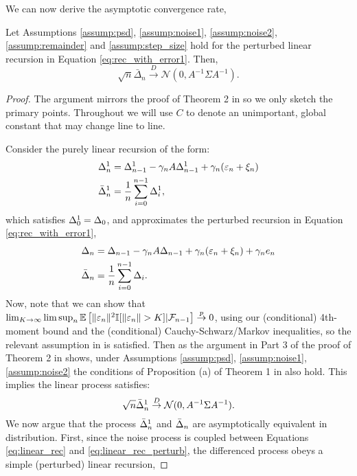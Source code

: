 We can now derive the asymptotic convergence rate,
\begin{theorem} \label{thm:asymp_ave}
  Let Assumptions \ref{assump:psd}, \ref{assump:noise1}, \ref{assump:noise2}, \ref{assump:remainder} and \ref{assump:step_size}
  hold for the perturbed linear recursion in Equation \eqref{eq:rec_with_error1}.
  Then,
\[
\sqrt n \bar{\Delta}_n  \overset{D}{\to} \mathcal N (0,  A^{-1}\Sigma A^{-1}).
\]
\end{theorem}
\begin{proof}
The argument mirrors the proof of Theorem 2 in \citet{polyak1992acceleration} so we only
sketch the primary points. Throughout we will use $C$ to denote an unimportant, global constant that may change line to line.

Consider the purely linear recursion of the form:
\begin{align}
  & \Delta^1_{n}=\Delta^1_{n-1} -\gamma_n A \Delta^1_{n-1}+ \gamma_n (\varepsilon_n+\xi_{n}) \label{eq:linear_rec} \\
  & \bar{\Delta}^1_{n} = \frac{1}{n} \sum_{i=0}^{n-1} \Delta^1_{i}, \nonumber
\end{align}
which satisfies $\Delta^1_{0} = \Delta_{0}$, and approximates the perturbed recursion in Equation \eqref{eq:rec_with_error1},
\begin{align}
  & \Delta_{n}=\Delta_{n-1} -\gamma_n A \Delta_{n-1}+ \gamma_n (\varepsilon_n+\xi_{n}) + \gamma_n e_{n} \label{eq:linear_rec_perturb} \\
  & \bar{\Delta}_{n} = \frac{1}{n} \sum_{i=0}^{n-1} \Delta_{i}. \nonumber
\end{align}
Now, note that we can show that
$\lim_{K \to \infty} \lim \sup_{n} \mathbb{E} \left[\Vert \varepsilon_n \Vert^2 \mathbb{I}[\Vert \varepsilon_n \Vert > K]|\mathcal{F}_{n-1} \right] \overset{p}{\to} 0$, using our (conditional) 4th-moment bound and the (conditional) Cauchy-Schwarz/Markov inequalities, so the relevant assumption in \citet{polyak1992acceleration} is satisfied. Then as the argument in Part 3 of the proof of Theorem 2 in
\citet{polyak1992acceleration} shows, under Assumptions \ref{assump:psd}, \ref{assump:noise1}, \ref{assump:noise2}
the conditions of Proposition (a) of Theorem 1 in \citet{polyak1992acceleration} also hold. This implies the linear process
satisfies:
\[
\sqrt n \bar{\Delta}^1_n  \overset{D}{\to} \mathcal N (0,  A^{-1}\Sigma A^{-1}). \notag
\]
We now argue that the process $\bar{\Delta}^1_n$ and $\bar{\Delta}_n$ are asymptotically equivalent in distribution. First,
since the noise process is coupled between Equations \ref{eq:linear_rec} and \ref{eq:linear_rec_perturb}, the differenced process
obeys a simple (perturbed) linear recursion,

\end{proof}
